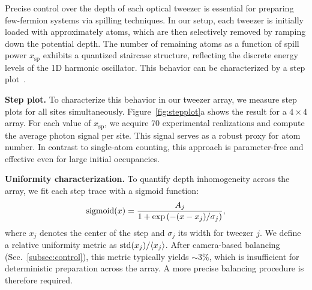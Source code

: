 
Precise control over the depth of each optical tweezer is essential for preparing few-fermion systems via spilling techniques. In our setup, each tweezer is initially loaded with approximately  atoms, which are then selectively removed by ramping down the potential depth. The number of remaining atoms as a function of spill power $x_{\mathrm{sp}}$ exhibits a quantized staircase structure, reflecting the discrete energy levels of the 1D harmonic oscillator. This behavior can be characterized by a step plot~\cite{holten_pauli_2022}.

\textbf{Step plot.}
To characterize this behavior in our tweezer array, we measure step plots for all sites simultaneously. Figure~\ref{fig:stepplot}a shows the result for a $4 \times 4$ array. For each value of $x_{\mathrm{sp}}$, we acquire 70 experimental realizations and compute the average photon signal per site. This signal serves as a robust proxy for atom number. In contrast to single-atom counting, this approach is parameter-free and effective even for large initial occupancies.

\textbf{Uniformity characterization.}
To quantify depth inhomogeneity across the array, we fit each step trace with a sigmoid function:
\begin{equation*}
    \mathop{\mathrm{sigmoid}}\nolimits(x) = \frac{A_j}{1 + \exp\left(-(x - x_j)/\sigma_j\right)},
\end{equation*}
where $x_j$ denotes the center of the step and $\sigma_j$ its width for tweezer $j$. We define a relative uniformity metric as $\mathop{\mathrm{std}}\nolimits(x_j) / \langle x_j \rangle$. After camera-based balancing (Sec.~\ref{subsec:control}), this metric typically yields $\sim 3\%$, which is insufficient for deterministic preparation across the array. A more precise balancing procedure is therefore required.

